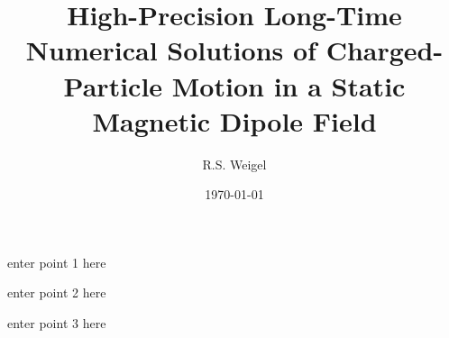 \documentclass[draft]{agujournal2019}
\begin{document}
%
%


\title{High-Precision Long-Time Numerical Solutions of Charged-Particle Motion in a Static Magnetic Dipole Field}


\author{R.S. Weigel}
\affil{}
\date{\today}





\begin{keypoints}
\item enter point 1 here
\item enter point 2 here
\item enter point 3 here
\end{keypoints}

%
%
\end{document}
